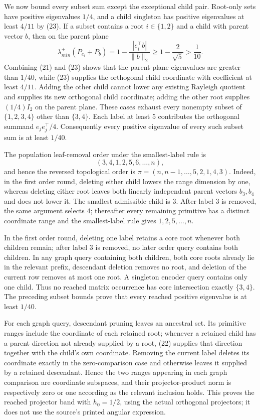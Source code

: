 We now bound every subset sum except the exceptional child pair.  Root-only sets have positive eigenvalues \(1/4\), and a child singleton has positive eigenvalues at least \(4/11\) by (23).  If a subset contains a root \(i\in\{1,2\}\) and a child with parent vector \(b\), then on the parent plane
\[
 \lambda_{min}^{+}(P_{e_i}+P_b)
 =1-\frac{|e_i^{\top}b|}{\|b\|_2}
 \ge1-\frac2{\sqrt5}>\frac1{10}.
\]
Combining (21) and (23) shows that the parent-plane eigenvalues are greater than \(1/40\), while (23) supplies the orthogonal child coordinate with coefficient at least \(4/11\).  Adding the other child cannot lower any existing Rayleigh quotient and supplies its new orthogonal child coordinate; adding the other root supplies \((1/4)I_2\) on the parent plane.  These cases exhaust every nonempty subset of \(\{1,2,3,4\}\) other than \(\{3,4\}\).  Each label at least \(5\) contributes the orthogonal summand \(e_je_j^{\top}/4\).  Consequently every positive eigenvalue of every such subset sum is at least \(1/40\).

The population leaf-removal order under the smallest-label rule is
\[
 (3,4,1,2,5,6,\ldots,n),
\]
and hence the reversed topological order is \(\pi=(n,n-1,\ldots,5,2,1,4,3)\).  Indeed, in the first order round, deleting either child lowers the range dimension by one, whereas deleting either root leaves both linearly independent parent vectors \(b_3,b_4\) and does not lower it.  The smallest admissible child is \(3\).  After label \(3\) is removed, the same argument selects \(4\); thereafter every remaining primitive has a distinct coordinate range and the smallest-label rule gives \(1,2,5,\ldots,n\).

In the first order round, deleting one label retains a core root whenever both children remain; after label \(3\) is removed, no later order query contains both children.  In any graph query containing both children, both core roots already lie in the relevant prefix, descendant deletion removes no root, and deletion of the current row removes at most one root.  A singleton encoder query contains only one child.  Thus no reached matrix occurrence has core intersection exactly \(\{3,4\}\).  The preceding subset bounds prove that every reached positive eigenvalue is at least \(1/40\).

For each graph query, descendant pruning leaves an ancestral set.  Its primitive ranges include the coordinate of each retained root; whenever a retained child has a parent direction not already supplied by a root, (22) supplies that direction together with the child's own coordinate.  Removing the current label deletes its coordinate exactly in the zero-comparison case and otherwise leaves it supplied by a retained descendant.  Hence the two ranges appearing in each graph comparison are coordinate subspaces, and their projector-product norm is respectively zero or one according as the relevant inclusion holds.  This proves the reached projector band with \(h_0=1/2\), using the actual orthogonal projectors; it does not use the source's printed angular expression.

